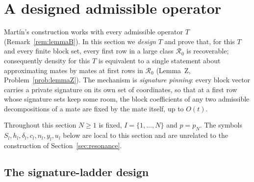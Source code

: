 
\section{A designed admissible operator}\label{sec:designed}

Mart\'in's construction works with every admissible operator $T$
(Remark~\ref{rem:lemmaB}).  In this section we \emph{design} $T$ and prove
that, for this $T$ and every finite block set, every first row in a large
class $\mathcal R_0$ is recoverable; consequently density for this $T$ is
equivalent to a single statement about approximating mates by mates at
first rows in $\mathcal R_0$ (Lemma~Z, Problem~\ref{prob:lemmaZ}).  The
mechanism is \emph{signature pinning}: every block vector carries a private
signature on its own set of coordinates, so that at a first row whose
signature sets keep some room, the block coefficients of any two admissible
decompositions of a mate are fixed by the mate itself, up to $O(t)$.

Throughout this section $N\ge1$ is fixed, $I=\{1,\dots,N\}$ and $p=p_N$.
The symbols $S_l,h_l,\delta_l,c_l,n_l,y_l,u_l$ below are local to this
section and are unrelated to the construction of
Section~\ref{sec:resonance}.

\subsection{The signature-ladder design}

